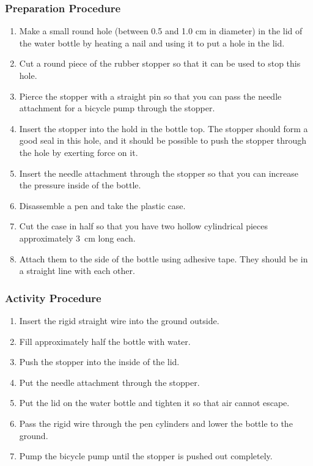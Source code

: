 \subsubsection*{Preparation Procedure}
\begin{enumerate}
\item{Make a small round hole (between 0.5 and 1.0 cm in diameter) in the lid of the water bottle by heating a nail and using it to put a hole in the lid.}
\item{Cut a round piece of the rubber stopper so that it can be used to stop this hole.}
\item{Pierce the stopper with a straight pin so that you can pass the needle attachment for a bicycle pump through the stopper.}
\item{Insert the stopper into the hold in the bottle top. The stopper should form a good seal in this hole, and it should be possible to push the stopper through the hole by exerting force on it.}
\item{Insert the needle attachment through the stopper so that you can increase the pressure inside of the bottle.}
\item{Disassemble a pen and take the plastic case.}
\item{Cut the case in half so that you have two hollow cylindrical pieces approximately 3~cm long each.}
\item{Attach them to the side of the bottle using adhesive tape. They should be in a straight line with each other.} 
\end{enumerate}

\subsubsection*{Activity Procedure}
\begin{enumerate}
\item{Insert the rigid straight wire into the ground outside.}
\item{Fill approximately half the bottle with water.}
\item{Push the stopper into the inside of the lid.}
\item{Put the needle attachment through the stopper.}
\item{Put the lid on the water bottle and tighten it so that air cannot escape.}
\item{Pass the rigid wire through the pen cylinders and lower the bottle to the ground.}\item{Pump the bicycle pump until the stopper is pushed out completely.}
\end{enumerate}

